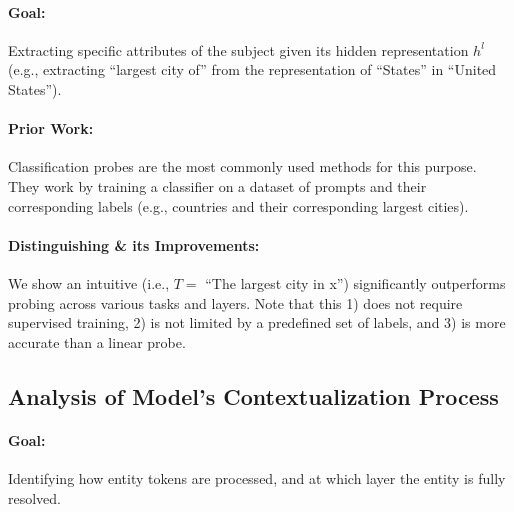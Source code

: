 \documentclass{article}
\theoremstyle{plain}
\theoremstyle{definition}
\theoremstyle{remark}
\begin{document}
\paragraph{Goal:} Extracting specific attributes of the subject given its hidden representation $h^l$ (e.g., extracting ``largest city of'' from the representation of ``States'' in ``United States'').

\paragraph{Prior Work:} Classification probes \citep{alain2017understanding} are the most commonly used methods for this purpose. They work by training a classifier on a dataset of prompts and their corresponding labels (e.g., countries and their corresponding largest cities).

\paragraph{Distinguishing \methodName{} \& its Improvements:} We show an intuitive \methodName{} (i.e., $T=$ ``The largest city in x'') significantly outperforms probing across various tasks and layers. Note that this \methodName{}  1) does not require supervised training, 2) is not limited by a predefined set of labels, and 3) is more accurate than a linear probe.

\subsection{Analysis of Model’s Contextualization Process}
\paragraph{Goal:} Identifying how entity tokens are processed, and at which layer the entity is fully resolved.
\end{document}
